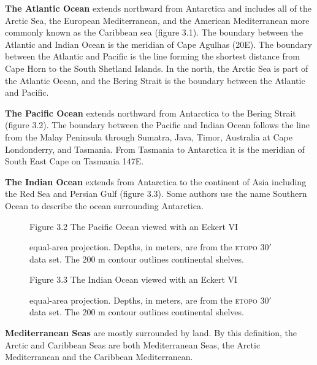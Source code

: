 \textbf{The Atlantic Ocean} extends
northward from Antarctica and includes all of the Arctic Sea, the
European Mediterranean, and the American Mediterranean more
commonly known as the Caribbean sea (figure 3.1). The boundary
between the Atlantic and Indian Ocean is the meridian of Cape
Agulhas (20\degrees E). The boundary between the Atlantic and
Pacific is the line forming the shortest distance from Cape
Horn to the South Shetland Islands. In the north, the Arctic Sea
is part of the Atlantic Ocean, and the Bering Strait is the
boundary between the Atlantic and Pacific.

\textbf{The Pacific Ocean} extends
northward from Antarctica to the Bering Strait (figure 3.2). The
boundary between the Pacific and Indian Ocean follows the line
from the Malay Peninsula through Sumatra, Java, Timor, Australia
at Cape Londonderry, and Tasmania. From Tasmania to Antarctica it
is the meridian of South East Cape on Tasmania 147\degrees E.

\textbf{The Indian Ocean} extends from
Antarctica to the continent of Asia including the Red Sea and
Persian Gulf (figure 3.3). Some authors use the name Southern
Ocean to describe the ocean surrounding Antarctica.

\begin{figure}[t!]
\centering
\footnotesize
Figure 3.2 The Pacific Ocean viewed with an Eckert VI\rule{0mm}{3ex} equal-area
projection. Depths, in meters, are from the \textsc{etopo} 30$'$ data set. The
200 m contour outlines continental shelves.

\label{fig:pacific}
\vspace{-4ex}
\end{figure}

\begin{figure}[t!]
\footnotesize
\centering
Figure 3.3 The Indian Ocean viewed with an Eckert VI\rule{0pt}{3ex}
equal-area projection. Depths, in meters, are from the \textsc{etopo} 30$'$ data
set. The 200 m contour outlines continental shelves.

\label{fig:indian}
\vspace{-4ex}
\end{figure}

\textbf{Mediterranean Seas} are mostly
surrounded by land. By this definition, the Arctic and Caribbean
Seas are both Mediterranean Seas, the Arctic Mediterranean and the
Caribbean Mediterranean.

